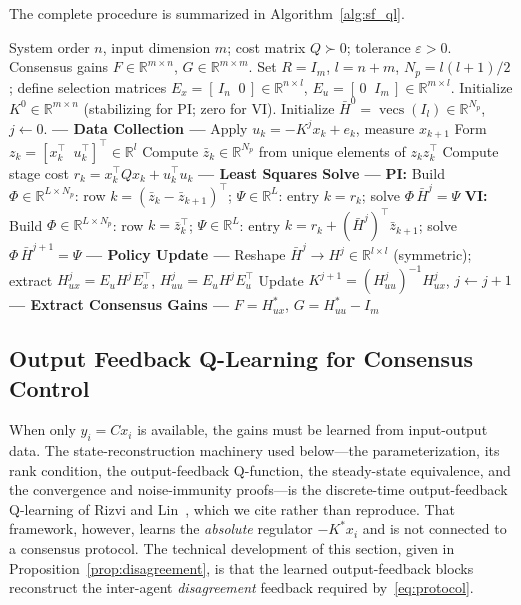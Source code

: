 \documentclass[12pt]{elsarticle}
\theoremstyle{remark}
\DeclareMathOperator{\vecs}{vecs}
\newcommand{\R}{\mathbb{R}}
\begin{document}
The complete procedure is summarized in Algorithm~\ref{alg:sf_ql}.

\begin{algorithm}[!htb]
\caption{State Feedback Q-Learning for Consensus Gains}
\label{alg:sf_ql}
\begin{algorithmic}[1]
\REQUIRE System order $n$, input dimension $m$; cost matrix $Q \succ 0$; tolerance $\varepsilon > 0$.
\ENSURE Consensus gains $F \in \R^{m \times n}$, $G \in \R^{m \times m}$.
\STATE Set $R = I_m$, $l = n + m$, $N_p = l(l+1)/2$; define selection matrices $E_x = [\,I_n \;\; 0\,] \in \R^{n \times l}$, $E_u = [\,0 \;\; I_m\,] \in \R^{m \times l}$.
\STATE Initialize $K^0 \in \R^{m \times n}$ (stabilizing for PI; zero for VI).
\STATE Initialize $\bar{H}^0 = \vecs(I_l) \in \R^{N_p}$, $j \leftarrow 0$.
\REPEAT
    \STATE \textbf{--- Data Collection ---}
        \STATE Apply $u_k = -K^j x_k + e_k$, measure $x_{k+1}$
        \STATE Form $z_k = [x_k^\top \;\; u_k^\top]^\top \in \R^l$
        \STATE Compute $\bar{z}_k \in \R^{N_p}$ from unique elements of $z_k z_k^\top$
        \STATE Compute stage cost $r_k = x_k^\top Q x_k + u_k^\top u_k$
    \ENDFOR
    \STATE \textbf{--- Least Squares Solve ---}
    \STATE \textbf{PI:} Build $\Phi \in \R^{L \times N_p}$: row $k = (\bar{z}_k - \bar{z}_{k+1})^\top$; \; $\Psi \in \R^L$: entry $k = r_k$; \; solve $\Phi \, \bar{H}^j = \Psi$
    \STATE \textbf{VI:} Build $\Phi \in \R^{L \times N_p}$: row $k = \bar{z}_k^\top$; \; $\Psi \in \R^L$: entry $k = r_k + (\bar{H}^j)^\top \bar{z}_{k+1}$; \; solve $\Phi \, \bar{H}^{j+1} = \Psi$
    \STATE \textbf{--- Policy Update ---}
    \STATE Reshape $\bar{H}^j \to H^j \in \R^{l \times l}$ (symmetric); extract $H_{ux}^j = E_u H^j E_x^\top$, \; $H_{uu}^j = E_u H^j E_u^\top$
    \STATE Update $K^{j+1} = (H_{uu}^j)^{-1} H_{ux}^j$, \; $j \leftarrow j + 1$
\STATE \textbf{--- Extract Consensus Gains ---}
\STATE $F = H_{ux}^*$, \quad $G = H_{uu}^* - I_m$
\end{algorithmic}
\end{algorithm}


\subsection{Output Feedback Q-Learning for Consensus Control}
\label{sec:ofb_ql}

When only $y_i = Cx_i$ is available, the gains must be learned from input-output data. The state-reconstruction machinery used below---the parameterization, its rank condition, the output-feedback Q-function, the steady-state equivalence, and the convergence and noise-immunity proofs---is the discrete-time output-feedback Q-learning of Rizvi and Lin~\cite{rizvi2022}, which we cite rather than reproduce. That framework, however, learns the \emph{absolute} regulator $-K^*x_i$ and is not connected to a consensus protocol. The technical development of this section, given in Proposition~\ref{prop:disagreement}, is that the learned output-feedback blocks reconstruct the inter-agent \emph{disagreement} feedback required by~\eqref{eq:protocol}.
\end{document}
